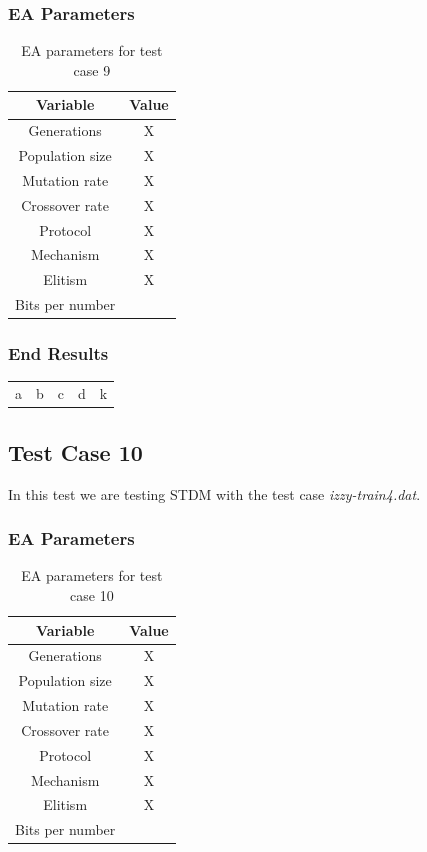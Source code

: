\subsubsection{EA Parameters}\label{sec:test-case-9-parameters}
\begin{table}
	\begin{tabular}{c c}
		Variable & Value \\
		\hline
		Generations & X \\
		\hline
		Population size & X \\
		\hline
		Mutation rate & X \\
		\hline
		Crossover rate & X \\
		\hline
		Protocol & X \\
		\hline
		Mechanism & X \\
		\hline
		Elitism & X \\
		\hline
		Bits per number & \\
	\end{tabular}
	\caption{EA parameters for test case 9}
\end{table}
\subsubsection{End Results}\label{sec:test-case-9-results}
\begin{table}
	\begin{tabular}{c c c c c}
		a & b & c & d & k \\
	\end{tabular}
\end{table}

\subsection{Test Case 10}\label{sec:test-case-10}
In this test we are testing STDM with the test case
\textit{izzy-train4.dat}.
\subsubsection{EA Parameters}\label{sec:test-case-10-parameters}
\begin{table}
	\begin{tabular}{c c}
		Variable & Value \\
		\hline
		Generations & X \\
		\hline
		Population size & X \\
		\hline
		Mutation rate & X \\
		\hline
		Crossover rate & X \\
		\hline
		Protocol & X \\
		\hline
		Mechanism & X \\
		\hline
		Elitism & X \\
		\hline
		Bits per number & \\
	\end{tabular}
	\caption{EA parameters for test case 10}
\end{table}
